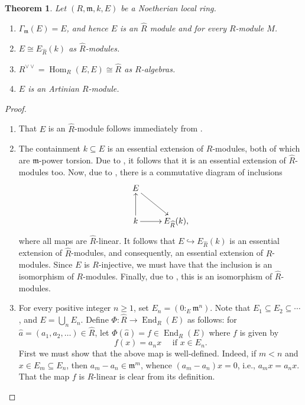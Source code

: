 \documentclass[10pt]{article}
\theoremstyle{thmstyle}
\newtheorem{theorem}{Theorem}[section]
\theoremstyle{defstyle}
\newcommand{\Hom}{\operatorname{Hom}}
\newcommand{\End}{\operatorname{End}}
\newcommand{\frakm}{\mathfrak{m}} %
\newcommand{\wh}[1]{\widehat{#1}}
\newcommand{\into}{\hookrightarrow}
\renewcommand{\ge}{\geqslant}
\begin{document}
\begin{theorem}
    Let $(R,\frakm, k, E)$ be a Noetherian local ring. 
    \begin{enumerate}[label=(\arabic*)]
        \item $\Gamma_{\frakm}(E) = E$, and hence $E$ is an $\wh R$ module and for every $R$-module $M$.
        \item $E\cong E_{\wh R}(k)$ as $\wh R$-modules.
        \item $R^{\vee\vee} = \Hom_R(E, E)\cong\wh R$ as $R$-algebras.
        \item $E$ is an Artinian $R$-module.
    \end{enumerate}
\end{theorem}
\begin{proof}
\begin{enumerate}[label=(\arabic*)]
    \item That $E$ is an $\wh R$-module follows immediately from .

    \item The containment $k\subseteq E$ is an essential extension of $R$-modules, both of which are $\frakm$-power torsion. Due to , it follows that it is an essential extension of $\wh R$-modules too. Now, due to , there is a commutative diagram of inclusions 
    \begin{equation*}
        \xymatrix {
            E\ar[rd]\\
            k\ar[u]\ar[r] & E_{\wh R}(k),
        }
    \end{equation*}
    where all maps are $\wh R$-linear. It follows that $E\into E_{\wh R}(k)$ is an essential extension of $\wh R$-modules, and consequently, an essential extension of $R$-modules. Since $E$ is $R$-injective, we must have that the inclusion is an isomorphism of $R$-modules. Finally, due to , this is an isomorphism of $\wh R$-modules.

    \item For every positive integer $n\ge 1$, set $E_n = \left(0 :_E \frakm^n\right)$. Note that $E_1\subseteq E_2\subseteq\cdots$, and $E = \bigcup_n E_n$. Define $\Phi: \wh R\to\End_R(E)$ as follows: for $\wh a = (a_1, a_2,\dots)\in\wh R$, let $\Phi(\wh a) = f\in\End_R(E)$ where $f$ is given by 
    \begin{equation*}
        f(x) = a_n x\quad\text{ if } x\in E_n.
    \end{equation*}
    First we must show that the above map is well-defined. Indeed, if $m < n$ and $x\in E_m\subseteq E_n$, then $a_m - a_n\in\frakm^m$, whence $(a_m - a_n) x = 0$, i.e., $a_m x = a_n x$. That the map $f$ is $R$-linear is clear from its definition. 


\end{enumerate}
\end{proof}
\end{document}
